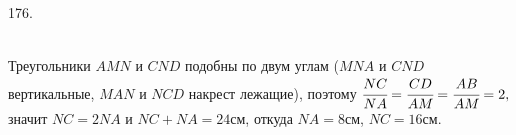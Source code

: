 176. \begin{figure}[ht!]
\end{figure}\\
Треугольники $AMN$ и $CND$ подобны по двум углам ($MNA$ и $CND$ вертикальные, $MAN$ и $NCD$ накрест лежащие), поэтому $\cfrac{NC}{NA}=\cfrac{CD}{AM}=\cfrac{AB}{AM}=2,$ значит $NC=2NA$ и $NC+NA=24$см, откуда $NA=8$см, $NC=16$см.\newpage\noindent
